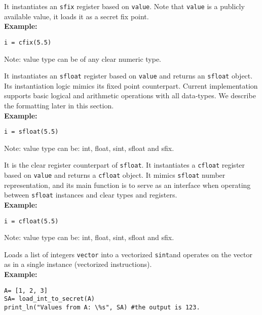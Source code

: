 It instantiates  an \verb|sfix| register based on \verb|value|. 
Note that \verb|value| is a publicly available value, it loads it as a secret fix point. 
\\
\textbf{Example:}
\begin{lstlisting}
i = cfix(5.5)
\end{lstlisting}
\begin{footnotesize}
Note: value type can be of any clear numeric type.
\end{footnotesize}


It instantiates  an \verb|sfloat| register based on \verb|value| and returns an \verb|sfloat| object. 
Its instantiation logic mimics its fixed point counterpart. 
Current implementation supports basic logical and arithmetic operations with all data-types.
We describe the formatting later in this section.\\
\textbf{Example:}
\begin{lstlisting}
i = sfloat(5.5)
\end{lstlisting}
\begin{footnotesize}
Note: value type can be: int, float, sint, sfloat and sfix.
\end{footnotesize}

It is the clear register counterpart of \verb|sfloat|.
It instantiates a \verb|cfloat| register based on \verb|value| and returns a \verb|cfloat| object. 
It mimics \verb|sfloat| number representation, 
and its main function is to serve as an interface when operating 
between \verb|sfloat| instances and clear types and registers.\\
\textbf{Example:}
\begin{lstlisting}
i = cfloat(5.5)
\end{lstlisting}
\begin{footnotesize}
Note: value type can be: int, float, sint, sfloat and sfix.
\end{footnotesize}

Loads a list of integers \verb|vector| into a vectorized \verb|sint|and  operates on the vector as in a single instance (vectorized instructions).\\
\textbf{Example:}
\begin{lstlisting}
A= [1, 2, 3]
SA= load_int_to_secret(A)
print_ln("Values from A: \%s", SA) #the output is 123.
\end{lstlisting}


